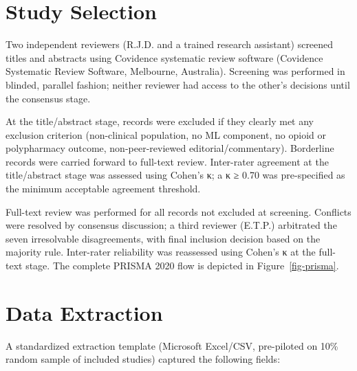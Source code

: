 \documentclass[
  12pt,
]{book}
\begin{document}
\section{Study Selection}\label{study-selection}

Two independent reviewers (R.J.D. and a trained research assistant)
screened titles and abstracts using Covidence systematic review software
(Covidence Systematic Review Software, Melbourne, Australia). Screening
was performed in blinded, parallel fashion; neither reviewer had access
to the other's decisions until the consensus stage.

At the title/abstract stage, records were excluded if they clearly met
any exclusion criterion (non-clinical population, no ML component, no
opioid or polypharmacy outcome, non-peer-reviewed editorial/commentary).
Borderline records were carried forward to full-text review. Inter-rater
agreement at the title/abstract stage was assessed using Cohen's κ; a κ
≥ 0.70 was pre-specified as the minimum acceptable agreement threshold.

Full-text review was performed for all records not excluded at
screening. Conflicts were resolved by consensus discussion; a third
reviewer (E.T.P.) arbitrated the seven irresolvable disagreements, with
final inclusion decision based on the majority rule. Inter-rater
reliability was reassessed using Cohen's κ at the full-text stage. The
complete PRISMA 2020 flow is depicted in Figure~\ref{fig-prisma}.

\section{Data Extraction}\label{data-extraction}

A standardized extraction template (Microsoft Excel/CSV, pre-piloted on
10\% random sample of included studies) captured the following fields:
\end{document}
